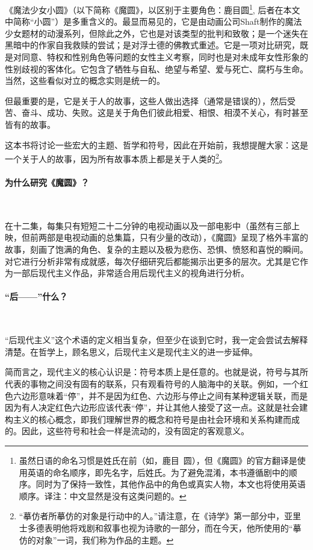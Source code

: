 《魔法少女小圆》（以下简称《魔圆》，以区别于主要角色：鹿目圆\footnote{虽然日语的命名习惯是姓氏在前（如，鹿目\, 圆），但《魔圆》的官方翻译是使用英语的命名顺序，即先名字，后姓氏。为了避免混淆，本书遵循剧中的顺序。同时为了保持一致性，其他作品中的角色或真实人物，本文也将使用英语顺序。译注：中文显然是没有这类问题的。}, 后者在本文中简称“小圆”）是多重含义的。最显而易见的，它是由动画公司Shaft制作的魔法少女题材的动漫系列，但除此之外，它也是对该类型的批判和致敬；是一个迷失在黑暗中的作家自我救赎的尝试；是对浮士德的佛教式重述。它是一项对比研究，既是对同意、特权和性别角色等问题的女性主义考察，同时也是对未成年女性形象的性别歧视的客体化。它包含了牺牲与自私、绝望与希望、爱与死亡、腐朽与生命。当然，这些看似对立的概念实则是统一的。

但最重要的是，它是关于人的故事，这些人做出选择（通常是错误的），然后受苦、奋斗、成功、失败。这是关于角色们彼此相爱、相恨、相漠不关心，有时甚至皆有的故事。

这本书将讨论一些宏大的主题、哲学和符号，因此在开始前，我想提醒大家：这是一个关于人的故事，因为所有故事本质上都是关于人类的\footnote{ “摹仿者所摹仿的对象是行动中的人。”请注意，在《诗学》第一部分中，亚里士多德表明他将戏剧和叙事也视为诗歌的一部分，而在今天，他所使用的“摹仿的对象”一词，我们称为作品的主题。}\cite{ref1}。 
\paragraph{为什么研究《魔圆》？}~{}

在十二集，每集只有短短二十二分钟的电视动画以及一部电影中（虽然有三部上映，但前两部是电视动画的总集篇，只有少量的改动），《魔圆》呈现了格外丰富的故事，刻画了饱满的角色、复杂的主题以及极为悲伤、恐惧、愤怒和喜悦的瞬间。对它进行分析非常有成就感，每次仔细研究后都能揭示出更多的层次。尤其是它作为一部后现代主义作品，非常适合用后现代主义的视角进行分析。
\paragraph{“后——”什么？}~{}

“后现代主义”这个术语的定义相当复杂，但至少在谈到它时，我一定会尝试去解释清楚。在哲学上，顾名思义，后现代主义是现代主义的进一步延伸。

简而言之，现代主义的核心认识是：符号本质上是任意的。也就是说，符号与其所代表的事物之间没有固有的联系，只有观看符号的人脑海中的关联。例如，一个红色六边形意味着“停”，并不是因为红色、六边形与停止之间有某种逻辑关联，而是因为有人决定红色六边形应该代表“停”，并让其他人接受了这一点。这就是社会建构主义的核心概念，即我们理解世界的概念和符号是由社会环境和关系构建而成的。因此，这些符号和社会一样是流动的，没有固定的客观意义\cite{ref2}。

